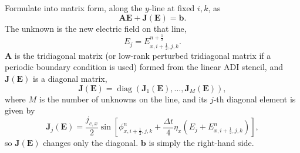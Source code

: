 \documentclass{article}
\numberwithin{figure}{section}
\begin{document}
Formulate into matrix form, along the \(y\)-line at fixed \(i,k\), as
\begin{equation}\label{eq:josephson-matrix}
    \mathbf{A}\mathbf{E}+\mathbf{J}(\mathbf{E})=\mathbf{b}.
\end{equation}
The unknown is the new electric field on that line,
\begin{equation}\label{eq:josephson-unknown}
    E_j=E_{x,i+\tfrac12,j,k}^{n+\frac12}.
\end{equation}
\(\mathbf{A}\) is the tridiagonal matrix (or low-rank perturbed tridiagonal matrix if a periodic boundary condition is used) formed from the linear ADI stencil, and \(\mathbf{J}(\mathbf{E})\) is a diagonal matrix, 
\begin{equation}
    \mathbf{J}(\mathbf{E}) = \operatorname{diag}\!\left(\mathbf{J}_1(\mathbf{E}),\ldots,\mathbf{J}_M(\mathbf{E})\right),
\end{equation}
where \(M\) is the number of unknowns on the line, and its \(j\)-th diagonal element is given by
\begin{equation}\label{eq:josephson-J-of-E}
    \mathbf{J}_j(\mathbf{E})=\frac{j_{c,x}}{2}\sin\!\left[\phi_{x,i+\tfrac12,j,k}^{n}+\frac{\Delta t}{4}\eta_x\left(E_j+E_{x,i+\tfrac12,j,k}^{n}\right)\right],
\end{equation}
so \(\mathbf{J}(\mathbf{E})\) changes only the diagonal. $\mathbf{b}$ is simply the right-hand side.
\end{document}
